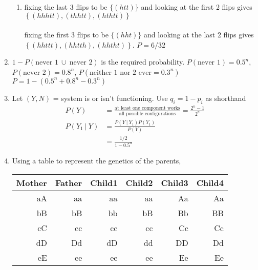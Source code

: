 \begin{enumerate}
\begin{enumerate}
		\item fixing the last 3 flips to be $ \{ (htt) \} $ and looking at the first 2 flips gives
		$ \left\{ (hhhtt), (thhtt), (hthtt) \right\} $ \\\\
		fixing the first 3 flips to be $ \{ (hht) \} $ and looking at the last 2 flips gives
		$ \left\{ (hhttt), (hhtth), (hhtht) \right\} $.
		$ P = 6/32 $\\
	\end{enumerate}
	
	\item $ 1 - P( \text{never 1}\  \cup\  \text{never 2}) $ is the required probability.
	$ P(\text{never 1}) = 0.5^n $, $ P(\text{never 2}) = 0.8^n $, $P(\text{neither 1 nor 2 ever} = 0.3^n)$ \\
	$ P = 1 - (0.5^n + 0.8^n - 0.3^n) $\\
	
	\item Let $ (Y, N) $ = system is or isn't functioning.  Use $ q_i = 1 - p_i $ as shorthand\\
	\begin{subequations}
		\begin{align}
			P(Y) &= \frac{\text{at least one component works}}{\text{all possible configurations}} = \frac{2^n - 1}{2^n} \\
			P(Y_1\ |\ Y) &= \frac{P(Y\ |\ Y_1) P(Y_1)}{P(Y)} \\
			&= \frac{1/2}{1 - 0.5^n}
		\end{align}
	\end{subequations}
	
	\item 	Using a table to represent the genetics of the parents, 
	\begin{table}[H]
		\centering
		\begin{tabular}{@{}rr|rrrr@{}}
			\toprule
			Mother & Father & Child1 & Child2 & Child3 & Child4 \\ \midrule
			aA     & aa		& aa	 & aa 	  & Aa 	   & Aa   \\
			bB     & bB     & bb	 & bB 	  & Bb 	   & BB    \\
			cC     & cc     & cc	 & cc 	  & Cc 	   & Cc    \\
			dD     & Dd     & dD	 & dd 	  & DD 	   & Dd    \\
			eE     & ee     & ee	 & ee 	  & Ee 	   & Ee    \\ \bottomrule
		\end{tabular}
	\end{table}
	

\end{enumerate}
